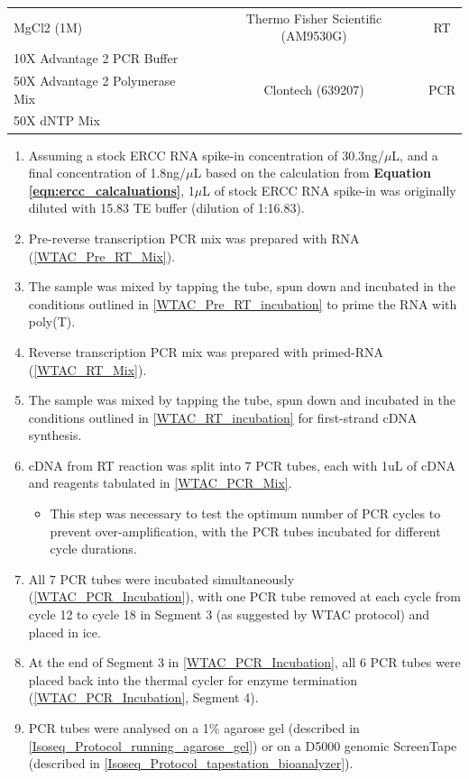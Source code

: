 \begin{table}[h]
\begin{tabularx}{0.95\textwidth}{lcc}
		MgCl2 (1M)                                                    & Thermo Fisher Scientific (AM9530G)                    & RT                   \\
		10X Advantage 2 PCR Buffer                                    & \multirow{3}{*}{Clontech (639207)}                    & \multirow{3}{*}{PCR} \\
		50X Advantage 2 Polymerase Mix                                &                                                       &                      \\
		50X dNTP Mix                                                  &                                                       &                      \\ \cmidrule(r){1-3}
	\end{tabularx}
\end{table}

\begin{enumerate}
	\item Assuming a stock ERCC RNA spike-in concentration of 30.3ng/$\mu$L, and a final concentration of 1.8ng/$\mu$L based on the calculation from \textbf{Equation \ref{eqn:ercc_calcaluations}}, 1$\mu$L of stock ERCC RNA spike-in was originally diluted with 15.83 TE buffer (dilution of 1:16.83). 
	\item Pre-reverse transcription PCR mix was prepared with RNA (\cref{WTAC_Pre_RT_Mix}).
	\item The sample was mixed by tapping the tube, spun down and incubated in the conditions outlined in \cref{WTAC_Pre_RT_incubation} to prime the RNA with poly(T).
	\item Reverse transcription PCR mix was prepared with primed-RNA (\cref{WTAC_RT_Mix}).
	\item The sample was mixed by tapping the tube, spun down and incubated in the conditions outlined in \cref{WTAC_RT_incubation} for first-strand cDNA synthesis.
	\item cDNA from RT reaction was split into 7 PCR tubes, each with 1uL of cDNA and reagents tabulated in \cref{WTAC_PCR_Mix}.
		\begin{itemize}
			\item This step was necessary to test the optimum number of PCR cycles to prevent over-amplification, with the PCR tubes incubated for different cycle durations.
		\end{itemize}
	\item All 7 PCR tubes were incubated simultaneously (\cref{WTAC_PCR_Incubation}), with one PCR tube removed at each cycle from cycle 12 to cycle 18 in Segment 3 (as suggested by WTAC protocol) and placed in ice.
	\item At the end of Segment 3 in \cref{WTAC_PCR_Incubation}, all 6 PCR tubes were placed back into the thermal cycler for enzyme termination (\cref{WTAC_PCR_Incubation}, Segment 4). 
	\item PCR tubes were analysed on a 1\% agarose gel (described in \cref{Isoseq_Protocol_running_agarose_gel}) or on a D5000 genomic ScreenTape (described in \cref{Isoseq_Protocol_tapestation_bioanalyzer}).	
\end{enumerate}

